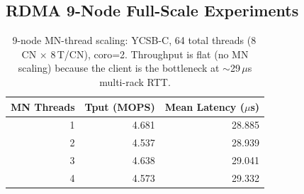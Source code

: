 \documentclass[conference]{IEEEtran}
\begin{document}
\subsection*{RDMA 9-Node Full-Scale Experiments}

\begin{table}[H]
\centering
\caption{9-node YCSB peak throughput (MOPS) at 64 total threads (8\,CN $\times$ 8\,T/CN, coro=2, 50M keys). Throughput is client-limited due to $\sim$29\,$\mu$s multi-rack RTT; no MN-thread scaling is visible.}
\label{tab:9node-ycsb-peak}
\scriptsize
{}
\end{table}

\begin{table}[H]
\centering
\caption{9-node MN-thread scaling: YCSB-C, 64 total threads (8\,CN $\times$ 8\,T/CN), coro=2. Throughput is flat (no MN scaling) because the client is the bottleneck at $\sim$29\,$\mu$s multi-rack RTT.}
\label{tab:9node-mt-scaling}
\scriptsize
\begin{tabular}{@{}rrr@{}}
\toprule
\textbf{MN Threads} & \textbf{Tput (MOPS)} & \textbf{Mean Latency ($\mu$s)} \\
\midrule
1 & 4.681 & 28.885 \\
2 & 4.537 & 28.939 \\
3 & 4.638 & 29.041 \\
4 & 4.573 & 29.332 \\
\bottomrule
\end{tabular}
\end{table}
\end{document}
